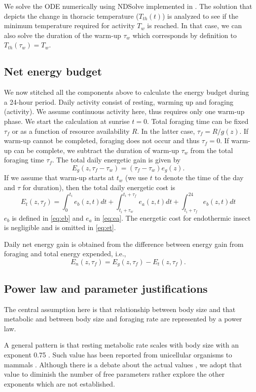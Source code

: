 We solve the ODE numerically using NDSolve implemented in \citet{Mathematica10}.
The solution that depicts the change in thoracic temperature  ($T_{th}(t)$) is analyzed to see if the minimum temperature  required for activity $T_w$ is reached.
In that case, we can also solve the duration of the warm-up $\tau_w$ which corresponds by definition to $T_{th}(\tau_w) = T_w$. 

 \subsection*{Net energy budget}
We now stitched all the components above to calculate  the energy budget during a 24-hour period.
Daily activity consist of resting, warming up and foraging (activity).
We assume continuous activity here, thus requires only one warm-up phase.
We start the calculation at sunrise $t = 0$.
Total foraging time can be fixed $\tau_f$ or as a function of resource availability $R$. 
In the latter case, $\tau_f = R/g(z)$.
If warm-up cannot be completed, foraging does not occur and thus $\tau_f = 0$.
If warm-up can be complete, we subtract the duration of warm-up $\tau_w$ from the total foraging time $\tau_f$. 
The total daily energetic gain is given by
\[
	E_g(z,\tau_f - \tau_w) = (\tau_f - \tau_w) e_g(z).
\]
%
If we assume that warm-up starts at $t_w$ (we use $t$ to denote the time of the day and $\tau$ for duration), then the total daily  energetic cost is
\begin{equation} \label{eq:et}
	E_t(z, \tau_f) = \int_0^{t_i} e_b(z, t) dt + \int_{t_i + \tau_w}^{t_i + \tau_f } e_a(z,t) dt + \int_{t_i+\tau_f}^{24} e_b(z, t) dt 
\end{equation}
$e_b$ is defined in \cref{eq:eb}  and $e_a$ in \cref{eq:ea}.
The energetic cost for endothermic insect is negligible \citep{Heinrich1975} and is omitted in \cref{eq:et}.

Daily net energy gain is obtained from the  difference between energy gain from foraging and total energy expended, i.e.,
\[ 
	E_n(z, \tau_f) = E_g(z,\tau_f) - E_t(z, \tau_f).
\]

\subsection*{Power law and parameter justifications}
The central assumption here is that relationship between body size and that metabolic and between body size and foraging rate are represented by a power law.

A general pattern is that resting metabolic rate scales with body size with an exponent 0.75 \citep{Kleiber1947, Peters1986, Brown2004}.
Such value has been reported from unicellular organisms to mammals \citep{Brown2004}.
Although there is a debate about the actual values \citep[e.g.,][]{Isaac2010}, we adopt that value to diminish the number of free parameters rather explore the other exponents which are not established.

